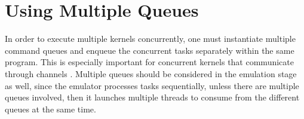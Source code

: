 \newpage

 \label{code:nondeptwo} 


\section{Using Multiple Queues}

In order to execute multiple kernels concurrently, one must instantiate multiple command queues and enqueue the concurrent tasks separately within the same program. This is especially important for concurrent kernels that communicate through channels \cite{intel2016sdk}. Multiple queues should be considered in the emulation stage as well, since the emulator processes tasks sequentially, unless there are multiple queues involved, then it launches multiple threads to consume from the different queues at the same time.


